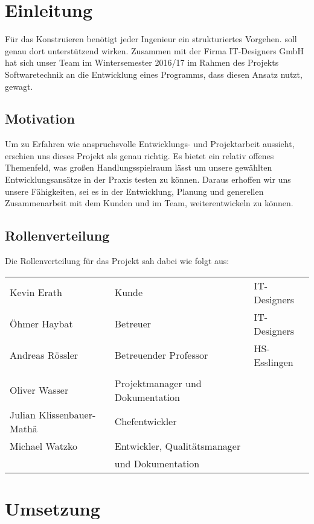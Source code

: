 
\section{Einleitung}

Für das Konstruieren benötigt jeder Ingenieur ein strukturiertes Vorgehen. \textFlowDesign{}
soll genau dort unterstützend wirken.
Zusammen mit der Firma IT-Designers GmbH hat sich unser Team im Wintersemester 2016/17 im
Rahmen des Projekts Softwaretechnik an die Entwicklung eines Programms, dass diesen Ansatz
nutzt, gewagt.

\subsection{Motivation}
Um zu Erfahren wie anspruchsvolle Entwicklungs- und Projektarbeit aussieht, erschien uns dieses Projekt als genau richtig. Es bietet ein relativ offenes Themenfeld, was großen Handlungsspielraum lässt um unsere gewählten Entwicklungsansätze in der Praxis testen zu können. Daraus erhoffen wir uns unsere Fähigkeiten, sei es in der Entwicklung, Planung und generellen Zusammenarbeit mit dem Kunden und im Team, weiterentwickeln zu können.

\subsection{Rollenverteilung}
Die Rollenverteilung für das Projekt sah dabei wie folgt aus:

\begin{center}
	\begin{tabular}{l|l l}
		Kevin Erath & Kunde     & IT-Designers \\
		Öhmer Haybat & Betreuer & IT-Designers \\
		Andreas Rössler & Betreuender Professor & HS-Esslingen \\
		\\
		Oliver Wasser             & Projektmanager und Dokumentation & \\
		Julian Klissenbauer-Mathä & Chefentwickler & \\
		Michael Watzko            & Entwickler, Qualitätsmanager  \\
		                          & und Dokumentation \\
	\end{tabular}
\end{center}

\pagebreak
\section{Umsetzung}

